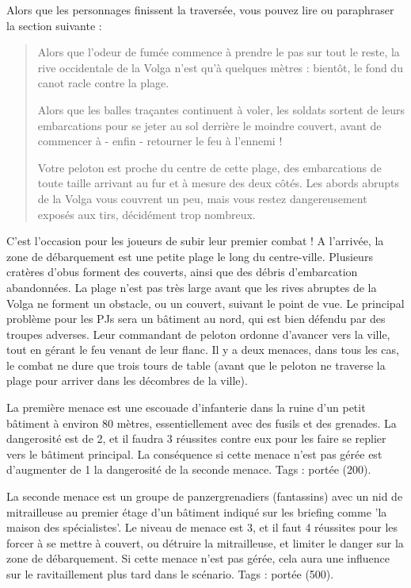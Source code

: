 \documentclass{report}
\begin{document}
\begin{multicols}{2}
Alors que les personnages finissent la traversée, vous pouvez lire ou paraphraser la section suivante :
\begin{quotation}
Alors que l'odeur de fumée commence à prendre le pas sur tout le reste, la rive occidentale de la Volga n'est qu'à quelques mètres : bientôt, le fond du canot racle contre la plage.

Alors que les balles traçantes continuent à voler, les soldats sortent de leurs embarcations pour se jeter au sol derrière le moindre couvert, avant de commencer à - enfin - retourner le feu à l'ennemi !

Votre peloton est proche du centre de cette plage, des embarcations de toute taille arrivant au fur et à mesure des deux côtés. Les abords abrupts de la Volga vous couvrent un peu, mais vous restez dangereusement exposés aux tirs, décidément trop nombreux.
\end{quotation}

C'est l'occasion pour les joueurs de subir leur premier combat ! A l'arrivée, la zone de débarquement est une petite plage le long du centre-ville. Plusieurs cratères d'obus forment des couverts, ainsi que des débris d'embarcation abandonnées. La plage n'est pas très large avant que les rives abruptes de la Volga ne forment un obstacle, ou un couvert, suivant le point de vue. Le principal problème pour les PJs sera un bâtiment au nord, qui est bien défendu par des troupes adverses. Leur commandant de peloton ordonne d'avancer vers la ville, tout en gérant le feu venant de leur flanc. Il y a deux menaces, dans tous les cas, le combat ne dure que trois tours de table (avant que le peloton ne traverse la plage pour arriver dans les décombres de la ville).

La première menace est une escouade d'infanterie dans la ruine d'un petit bâtiment à environ 80 mètres, essentiellement avec des fusils et des grenades. La dangerosité est de 2, et il faudra 3 réussites contre eux pour les faire se replier vers le bâtiment principal. La conséquence si cette menace n'est pas gérée est d'augmenter de 1 la dangerosité de la seconde menace. Tags : portée (200).

La seconde menace est un groupe de panzergrenadiers (fantassins) avec un nid de mitrailleuse au premier étage d'un bâtiment indiqué sur les briefing comme 'la maison des spécialistes'. Le niveau de menace est 3, et il faut 4 réussites pour les forcer à se mettre à couvert, ou détruire la mitrailleuse, et limiter le danger sur la zone de débarquement. Si cette menace n'est pas gérée, cela aura une influence sur le ravitaillement plus tard dans le scénario. Tags : portée (500).

\end{multicols}
\end{document}
